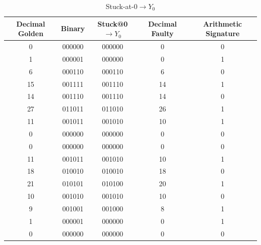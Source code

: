 \begin{table}[tb!]
\center
\caption{Stuck-at-0$\rightarrow Y_0$}
\label{firtable1}
\begin{tabular}{|c | c| c | c| c |} 
 \hline
 \rowcolor{lightgray}
Decimal Golden & Binary & Stuck@0$\rightarrow Y_0$ & Decimal Faulty & Arithmetic Signature   \\ 
\hline
 
 
 0 & 000000 & 000000 & 0 & 0  \\
 \hline

 1 & 000001 & 000000 & 0 & 1 \\
 \hline
 
 6 & 000110 & 000110 & 6 & 0 \\
 \hline
 15 & 001111 & 001110 & 14 & 1 \\
 \hline
 14 & 001110 & 001110 & 14 & 0 \\
 \hline
 27 & 011011 & 011010 & 26 & 1 \\
 \hline
 11 & 001011 & 001010 & 10 & 1 \\
 \hline
 0 & 000000 & 000000 & 0 & 0 \\
 \hline
 0 & 000000 & 000000 & 0 & 0 \\
 \hline
 11 & 001011 & 001010 & 10 & 1 \\
 \hline
 18 & 010010 & 010010 & 18 & 0 \\
 \hline
 
 21 & 010101 & 010100 & 20 & 1 \\
 \hline
 10 & 001010 & 001010 & 10 & 0 \\
 \hline
 9 & 001001& 001000 & 8 & 1 \\
 \hline
 1 & 000001 & 000000 & 0 & 1 \\
 \hline
 0 & 000000 & 000000 & 0 & 0 \\
 \hline




 
 
\end{tabular}
\end{table}






